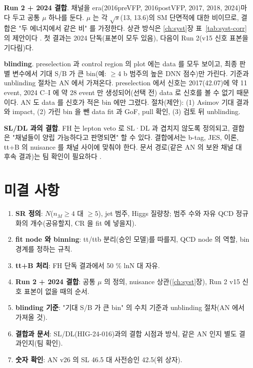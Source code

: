 \textbf{Run 2 + 2024 결합}. 채널을 era(2016preVFP, 2016postVFP, 2017, 2018, 2024)마다 두고 공통 $\mu$ 하나를 둔다. $\mu$ 는 각 $\sqrt{s}$(13, 13.6\TeV)의 SM
단면적에 대한 비이므로, 결합은 "두 에너지에서 같은 비" 를 가정한다. 상관 방식은 \ref{ch:syst}장 표~\ref{tab:syst-corr} 의 제안이다 \tagopen. 첫 결과는
2024 단독(표본이 모두 있음), 다음이 Run 2(v15 신호 표본을 기다림)다.

\textbf{blinding}. preselection 과 control region 의 plot 에는 data 를 모두 보이고, 최종 판별 변수에서 기대 S/B 가 큰 bin(예: $\ge4$ b 범주의 높은 DNN 점수)만
가린다. 기준과 unblinding 절차는 AN 에서 가져온다. preselection 에서 신호는 2017(42.07\fbinv)에 약 11 event, 2024 C--I 에 약 28 event 만
생성되어(선택 전) data 로 신호를 볼 수 없기 때문이다. AN 도 data 를 신호가 적은 bin 에만 그렸다.
절차(제안): (1) Asimov 기대 결과와 impact, (2) 가린 bin 을 뺀 data fit 과 GoF, pull 확인, (3) 검토 뒤 unblinding.

\textbf{SL/DL 과의 결합}. FH 는 lepton veto 로 SL·DL 과 겹치지 않도록 정의되고, 결합은 "채널들이 양립 가능하다고 판명되면" 할 수 있다.
결합에서는 b-tag, JES, 이론, tt+B 의 nuisance 를 채널 사이에 맞춰야 한다. 문서 경로(같은 AN 의 보완 채널 대 후속 결과)는 팀 확인이 필요하다
.

\section{미결 사항}\label{sec:stats-open}

\begin{openq}
\begin{enumerate}
\item \textbf{SR 정의}: $N$($n_M\ge4$ 대 $\ge5$), jet 범주, Higgs 질량창; 범주 수와 자유 QCD 정규화의 개수(공유할지, CR 을 fit 에 넣을지).
\item \textbf{fit node 와 binning}: tt/ttb 분리(승인 모델)를 따를지, QCD node 의 역할, bin 경계를 정하는 규칙.
\item \textbf{tt+B 처리}: FH 단독 결과에서 50 \% lnN 대 자유.
\item \textbf{Run 2 + 2024 결합}: 공통 $\mu$ 의 정의, nuisance 상관(\ref{ch:syst}장), Run 2 v15 신호 표본이 없을 때의 순서.
\item \textbf{blinding 기준}: "기대 S/B 가 큰 bin" 의 수치 기준과 unblinding 절차(AN 에서 가져올 것).
\item \textbf{결합과 문서}: SL/DL(HIG-24-016)과의 결합 시점과 방식, 같은 AN 인지 별도 결과인지(팀 확인).
\item \textbf{숫자 확인}: AN v26 의 SL 46.5 대 사전승인 42.5(위 상자).
\end{enumerate}
\end{openq}
